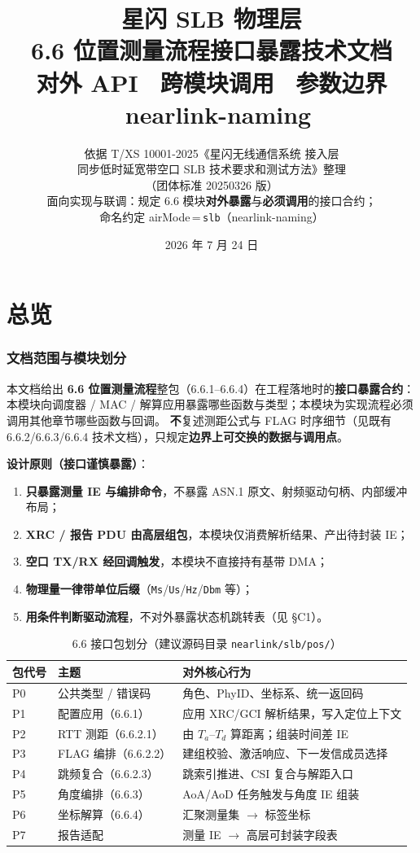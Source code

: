 \documentclass[11pt,a4paper]{ctexart}
\title{%
  \textbf{星闪 SLB 物理层}\\[0.4em]
  \Large 6.6 位置测量流程接口暴露技术文档\\[0.3em]
  \large 对外 API \textbullet\ 跨模块调用 \textbullet\ 参数边界 \textbullet\ nearlink-naming
}
\author{依据 T/XS 10001-2025《星闪无线通信系统 接入层\\
同步低时延宽带空口 SLB 技术要求和测试方法》整理\\
（团体标准 20250326 版）\\[0.3em]
\small 面向实现与联调：规定 6.6 模块\textbf{对外暴露}与\textbf{必须调用}的接口合约；\\
\small 命名约定 airMode\,=\,\texttt{slb}（nearlink-naming）
}
\date{2026 年 7 月 24 日}
\begin{document}
\maketitle
\tableofcontents
\newpage

\part{总览}

\section{文档范围与模块划分}

本文档给出 \textbf{6.6 位置测量流程}整包（6.6.1--6.6.4）在工程落地时的\textbf{接口暴露合约}：
本模块向调度器 / MAC / 解算应用暴露哪些函数与类型；本模块为实现流程必须调用其他章节哪些函数与回调。
\textbf{不}复述测距公式与 FLAG 时序细节（见既有 6.6.2/6.6.3/6.6.4 技术文档），只规定\textbf{边界上可交换的数据与调用点}。

\textbf{设计原则（接口谨慎暴露）}：
\begin{enumerate}[nosep]
  \item \textbf{只暴露测量 IE 与编排命令}，不暴露 ASN.1 原文、射频驱动句柄、内部缓冲布局；
  \item \textbf{XRC / 报告 PDU 由高层组包}，本模块仅消费解析结果、产出待封装 IE；
  \item \textbf{空口 TX/RX 经回调触发}，本模块不直接持有基带 DMA；
  \item \textbf{物理量一律带单位后缀}（\texttt{Ms}/\texttt{Us}/\texttt{Hz}/\texttt{Dbm} 等）；
  \item \textbf{用条件判断驱动流程}，不对外暴露状态机跳转表（见 §C1）。
\end{enumerate}

\begin{table}[h]
\centering
\small
\caption{6.6 接口包划分（建议源码目录 \texttt{nearlink/slb/pos/}）}
\begin{tabular}{lll}
\toprule
\textbf{包代号} & \textbf{主题} & \textbf{对外核心行为} \\
\midrule
P0 & 公共类型 / 错误码 & 角色、PhyID、坐标系、统一返回码 \\
P1 & 配置应用（6.6.1） & 应用 XRC/GCI 解析结果，写入定位上下文 \\
P2 & RTT 测距（6.6.2.1） & 由 $T_a$--$T_d$ 算距离；组装时间差 IE \\
P3 & FLAG 编排（6.6.2.2） & 建组校验、激活响应、下一发信成员选择 \\
P4 & 跳频复合（6.6.2.3） & 跳索引推进、CSI 复合与解距入口 \\
P5 & 角度编排（6.6.3） & AoA/AoD 任务触发与角度 IE 组装 \\
P6 & 坐标解算（6.6.4） & 汇聚测量集 $\rightarrow$ 标签坐标 \\
P7 & 报告适配 & 测量 IE $\rightarrow$ 高层可封装字段表 \\
\bottomrule
\end{tabular}
\end{table}
\end{document}
